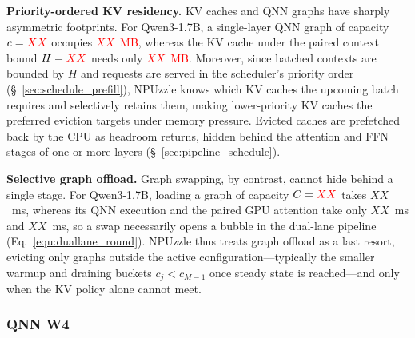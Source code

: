\documentclass[sigconf,nonacm,10pt]{acmart}
\newcommand{\name}{NPUzzle\xspace}
\begin{document}
{\noindent\textbf{Priority-ordered KV residency.}
KV caches and QNN graphs have sharply asymmetric footprints. For Qwen3-1.7B, a single-layer QNN graph of capacity $c=\textcolor{red}{XX}$ occupies \textcolor{red}{$XX$~MB}, whereas the KV cache under the paired context bound $H=\textcolor{red}{XX}$ needs only \textcolor{red}{$XX$~MB}. Moreover, since batched contexts are bounded by $H$ and requests are served in the scheduler's priority order (\S~\ref{sec:schedule_prefill}), \name knows which KV caches the upcoming batch requires and selectively retains them, making lower-priority KV caches the preferred eviction targets under memory pressure. Evicted caches are prefetched back by the CPU as headroom returns, hidden behind the attention and FFN stages of one or more layers (\S~\ref{sec:pipeline_schedule}).


\noindent\textbf{Selective graph offload.}
Graph swapping, by contrast, cannot hide behind a single stage. For Qwen3-1.7B, loading a graph of capacity $C=\textcolor{red}{XX}$ takes {\color{red}$XX$~ms}, whereas its QNN execution and the paired GPU attention take only {\color{red}$XX$~ms} and {\color{red}$XX$~ms}, so a swap necessarily opens a bubble in the dual-lane pipeline (Eq.~\eqref{equ:duallane_round}). \name thus treats graph offload as a last resort, evicting only graphs outside the active configuration---typically the smaller warmup and draining buckets $c_j<c_{M-1}$ once steady state is reached---and only when the KV policy alone cannot meet.

{\color{red}
\subsubsection{QNN W4}

}}
\end{document}
